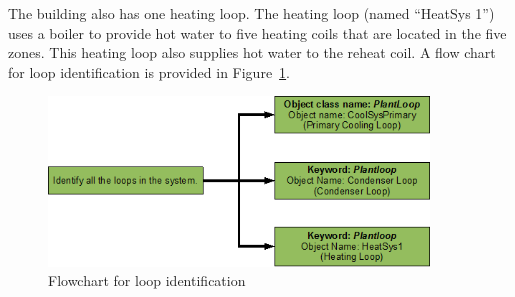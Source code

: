 The building also has one heating loop. The heating loop (named ``HeatSys 1'') uses a boiler to provide hot water to five heating coils that are located in the five zones. This heating loop also supplies hot water to the reheat coil. A flow chart for loop identification is provided in Figure~\ref{fig:flowchart-for-loop-identification-001}.

\begin{figure}[hbtp] %
\centering
\includegraphics[width=0.9\textwidth, height=0.9\textheight, keepaspectratio=true]{media/image045.png}
\caption{Flowchart for loop identification \protect \label{fig:flowchart-for-loop-identification-001}}
\end{figure}
